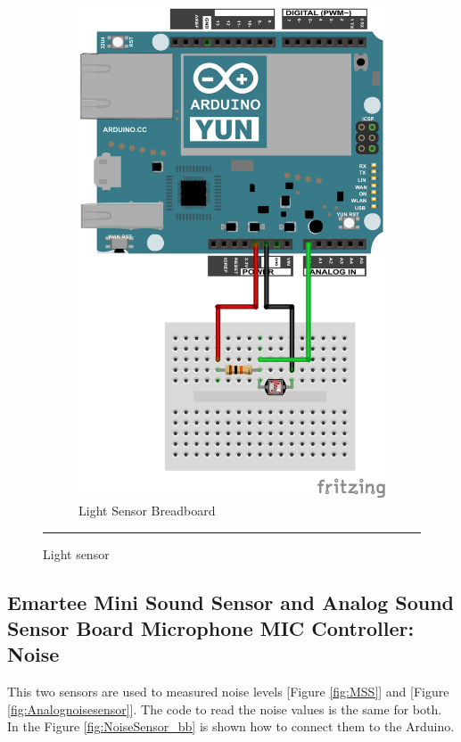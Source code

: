 \documentclass[12pt, a4paper,twoside]{tesi_upf}
\begin{document}
\begin{figure}
\begin{subfigure}[b]{0.3\textwidth}
                \includegraphics[width=\textwidth]{./Figures/Fritzing/LightSensor_bb.png}
                \caption{Light Sensor Breadboard}
                \label{fig:LightSensor_bb}
        \end{subfigure}
        \rule{18em}{0.5pt}
        \caption{Light sensor}\label{fig:lightsensor}
			\end{figure}
 
    \subsection{Emartee Mini Sound Sensor and Analog Sound Sensor Board Microphone MIC Controller: Noise}
      This two sensors \cite{emarteeminisound} are used to measured noise levels [Figure \ref{fig:MSS}] and [Figure \ref{fig:Analognoisesensor}]. The code to read the noise values is the same for both. In the Figure \ref{fig:NoiseSensor_bb} is shown how to connect them to the Arduino.
      
\end{document}
